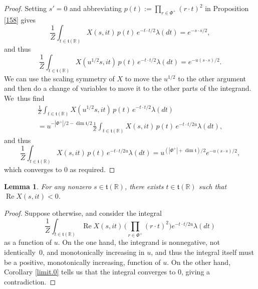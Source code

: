 \documentclass[JEP,XML,SOM,Unicode,NoFloatCountersInSection,published]{cedram}
\newtheorem{lem}[equation]{Lemma}
\theoremstyle{definition}
\newcommand{\mft}{\mathfrak{t}}
\newcommand{\R}{\mathbb{R}}
\DeclareMathOperator{\RE}{Re}
\begin{document}
\begin{proof}
Setting $s'=0$ and abbreviating $p(t) := \prod_{r\in \Phi^+} (r\cdot t)^2$ in Proposition \ref{158} gives
\[
\frac{1}{Z}
\int_{t\in \mft(\R)} X(s,it)
\,p(t)\,
e^{-t\cdot t/2}
\lambda(dt)
=
e^{-s\cdot s/2},
\]
and thus
\[
\frac{1}{Z}
\int_{t\in \mft(\R)} X(u^{1/2}s,it)
\, p(t)\,
e^{-t\cdot t/2}
\lambda(dt)
=
e^{-u(s\cdot s)/2}.
\]
We can use the scaling symmetry of $X$ to move the $u^{1/2}$ to the other
argument and then do a change of variables to move it to the other parts
of the integrand. We~thus find
\begin{multline*}
\frac{1}{Z}
\int_{t\in \mft(\R)} X(u^{1/2}s,it)
\,p(t)\,
e^{-t\cdot t/2}
\lambda(dt)\\
=u^{-|\Phi^+|/2-\dim\mft/2}
\frac{1}{Z}
\int_{t\in \mft(\R)} X(s,it)
\, p(t) \,
e^{-t\cdot t/2u}
\lambda(dt),
\end{multline*}
and thus
\[
\frac{1}{Z}
\int_{t\in \mft(\R)} X(s,it)
\, p(t) \,
e^{-t\cdot t/2u}
\lambda(dt)
=
u^{(|\Phi^+|+\dim\mft)/2}
e^{-u(s\cdot s)/2},
\]
which converges to $0$ as required.
\end{proof}

\begin{lem} \label{t.neg}
For any nonzero $s\in \mft(\R)$, there exists $t\in \mft(\R)$
such that $\RE X(s,it)<0$.
\end{lem}

\begin{proof}
Suppose otherwise, and consider the integral
\[
\frac{1}{Z}
\int_{t\in \mft(\R)}
\RE X(s,it) \,
\biggl(\prod_{r\in \Phi^+} (r\cdot t)^2 \biggr)
e^{-t\cdot t/2u}
\lambda(dt)
\]
as a function of $u$. On the one hand, the integrand is nonnegative,
not identically~0, and monotonically increasing in $u$, and thus the
integral itself must be a positive, monotonically increasing, function of
$u$. On the other hand, Corollary \ref{limit.0} tells us that the
integral converges to 0, giving a contradiction.
\end{proof}
\end{document}
